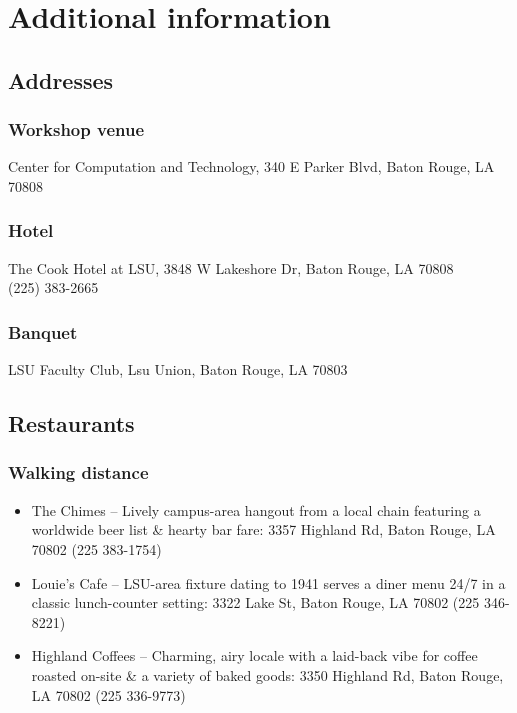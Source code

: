 \documentclass[12pt]{book}
\begin{document}
%
%
%

\chapter{Additional information}

\section{Addresses}

\subsection*{Workshop venue}
Center for Computation and Technology, 340 E Parker Blvd, Baton Rouge, LA 70808
\subsection*{Hotel}
The Cook Hotel at LSU, 3848 W Lakeshore Dr, Baton Rouge, LA 70808 \\
(225) 383-2665
\subsection*{Banquet}
LSU Faculty Club, Lsu Union, Baton Rouge, LA 70803

\section{Restaurants}

\subsection*{Walking distance}

\begin{itemize}
\item The Chimes -- Lively campus-area hangout from a local chain featuring a worldwide beer list \& hearty bar fare: 3357 Highland Rd, Baton Rouge, LA 70802 (225 383-1754)
\item Louie's Cafe -- LSU-area fixture dating to 1941 serves a diner menu 24/7 in a classic lunch-counter setting: 3322 Lake St, Baton Rouge, LA 70802 (225 346-8221)
\item Highland Coffees -- Charming, airy locale with a laid-back vibe for coffee roasted on-site \& a variety of baked goods: 3350 Highland Rd, Baton Rouge, LA 70802 (225 336-9773)
\end{itemize}
\end{document}
